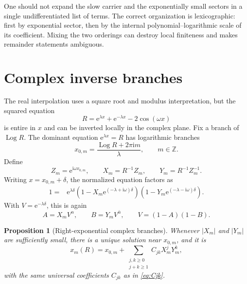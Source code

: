 \documentclass[11pt,oneside]{article}
\numberwithin{equation}{section}
\theoremstyle{plain}
\newtheorem{proposition}[theorem]{Proposition}
\theoremstyle{definition}
\theoremstyle{remark}
\newcommand{\e}{\mathrm e}
\newcommand{\ii}{\mathrm i}
\newcommand{\Logp}{\operatorname{Log}}
\begin{document}
\begin{warningbox}
One should not expand the slow carrier and the exponentially small sectors
in a single undifferentiated list of terms.  The correct organization is
lexicographic: first by exponential sector, then by the internal
polynomial--logarithmic scale of its coefficient.  Mixing the two orderings
can destroy local finiteness and makes remainder statements ambiguous.
\end{warningbox}

\section{Complex inverse branches}\label{sec:complex-branches}

The real interpolation uses a square root and modulus interpretation, but
the squared equation
\begin{equation}\label{eq:complex-squared}
 R=\e^{\lambda x}+\e^{-\lambda x}-2\cos(\omega x)
\end{equation}
is entire in \(x\) and can be inverted locally in the complex plane.  Fix a
branch of \(\Logp R\).  The dominant equation \(\e^{\lambda x}=R\) has
logarithmic branches
\begin{equation}\label{eq:x0m}
 x_{0,m}=\frac{\Logp R+2\pi\ii m}{\lambda},
 \qquad m\in\mathbb Z.
\end{equation}
Define
\begin{equation}\label{eq:ZmXYm}
 Z_m=\e^{\ii\omega x_{0,m}},
 \qquad
 X_m=R^{-1}Z_m,
 \qquad
 Y_m=R^{-1}Z_m^{-1}.
\end{equation}
Writing \(x=x_{0,m}+\delta\), the normalized equation factors as
\begin{align}
 1={}&\e^{\lambda\delta}
 \left(1-X_m\e^{(-\lambda+\ii\omega)\delta}\right)
 \left(1-Y_m\e^{(-\lambda-\ii\omega)\delta}\right).
 \label{eq:complex-factor-delta}
\end{align}
With \(V=\e^{-\lambda\delta}\), this is again
\[
 A=X_mV^\alpha,
 \qquad B=Y_mV^{\bar\alpha},
 \qquad V=(1-A)(1-B).
\]

\begin{proposition}[Right-exponential complex branches]\label{prop:complex-branches}
Whenever \(|X_m|\) and \(|Y_m|\) are sufficiently small, there is a unique
solution near \(x_{0,m}\), and it is
\begin{equation}\label{eq:complex-branch-series}
 x_m(R)=x_{0,m}+
 \sum_{\substack{j,k\ge0\\j+k\ge1}}C_{jk}X_m^jY_m^k,
\end{equation}
with the same universal coefficients \(C_{jk}\) as in
\cref{eq:Cjk}.
\end{proposition}
\end{document}
